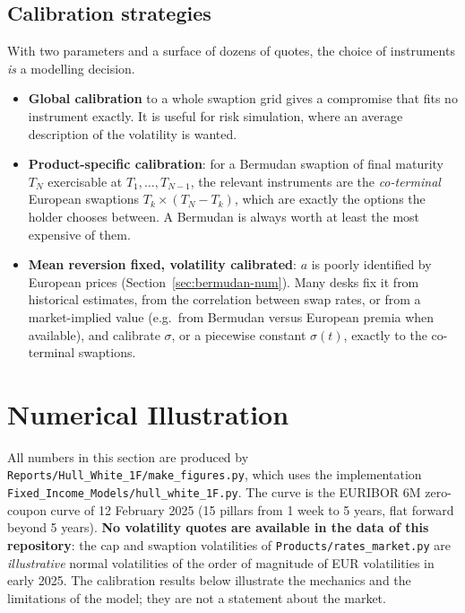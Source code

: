 \documentclass[11pt,a4paper]{article}
\theoremstyle{plain}
\theoremstyle{definition}
\begin{document}
\subsection{Calibration strategies}
With two parameters and a surface of dozens of quotes, the choice of instruments \emph{is} a modelling decision.
\begin{itemize}
    \item \textbf{Global calibration} to a whole swaption grid gives a compromise that fits no instrument exactly. It is useful for risk simulation, where an average description of the volatility is wanted.
    \item \textbf{Product-specific calibration}: for a Bermudan swaption of final maturity $T_N$ exercisable at $T_1,\dots,T_{N-1}$, the relevant instruments are the \emph{co-terminal} European swaptions $T_k\times(T_N-T_k)$, which are exactly the options the holder chooses between. A Bermudan is always worth at least the most expensive of them.
    \item \textbf{Mean reversion fixed, volatility calibrated}: $a$ is poorly identified by European prices (Section~\ref{sec:bermudan-num}). Many desks fix it from historical estimates, from the correlation between swap rates, or from a market-implied value (e.g.\ from Bermudan versus European premia when available), and calibrate $\sigma$, or a piecewise constant $\sigma(t)$, exactly to the co-terminal swaptions.
\end{itemize}

\clearpage
\section{Numerical Illustration}
\label{sec:numerics}

All numbers in this section are produced by \texttt{Reports/Hull\_White\_1F/make\_figures.py}, which uses the implementation \texttt{Fixed\_Income\_Models/hull\_white\_1F.py}. The curve is the EURIBOR 6M zero-coupon curve of 12 February 2025 (15 pillars from 1 week to 5 years, flat forward beyond 5 years). \textbf{No volatility quotes are available in the data of this repository}: the cap and swaption volatilities of \texttt{Products/rates\_market.py} are \emph{illustrative} normal volatilities of the order of magnitude of EUR volatilities in early 2025. The calibration results below illustrate the mechanics and the limitations of the model; they are not a statement about the market.
\end{document}
